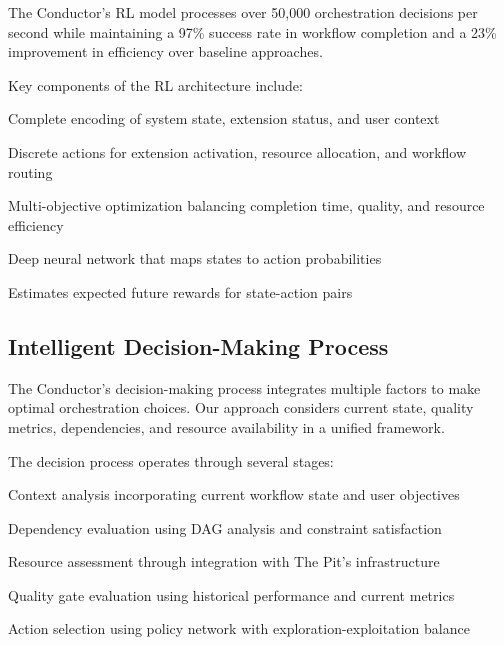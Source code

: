 \begin{alertbox}
The Conductor's RL model processes over 50,000 orchestration decisions per second while maintaining a 97\% success rate in workflow completion and a 23\% improvement in efficiency over baseline approaches.
\end{alertbox}

Key components of the RL architecture include:

\begin{description}[leftmargin=4cm,labelwidth=3.5cm]
    \item[\textbf{State Representation}] Complete encoding of system state, extension status, and user context
    \item[\textbf{Action Space}] Discrete actions for extension activation, resource allocation, and workflow routing
    \item[\textbf{Reward Function}] Multi-objective optimization balancing completion time, quality, and resource efficiency
    \item[\textbf{Policy Network}] Deep neural network that maps states to action probabilities
    \item[\textbf{Value Network}] Estimates expected future rewards for state-action pairs
\end{description}

\subsection*{Intelligent Decision-Making Process}

The Conductor's decision-making process integrates multiple factors to make optimal orchestration choices. Our approach considers current state, quality metrics, dependencies, and resource availability in a unified framework.

The decision process operates through several stages:

\begin{compactlist}
    \item Context analysis incorporating current workflow state and user objectives
    \item Dependency evaluation using DAG analysis and constraint satisfaction
    \item Resource assessment through integration with The Pit's infrastructure
    \item Quality gate evaluation using historical performance and current metrics
    \item Action selection using policy network with exploration-exploitation balance
\end{compactlist}

